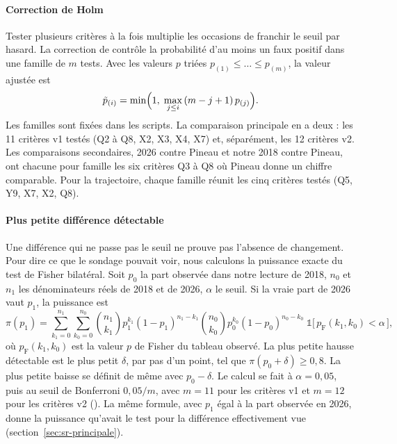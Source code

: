 \paragraph{Correction de Holm}
Tester plusieurs critères à la fois multiplie les occasions de franchir le seuil par hasard. La
correction de \textcite{holm1979simple} contrôle la probabilité d'au moins un faux positif dans une
famille de $m$ tests. Avec les valeurs $p$ triées $p_{(1)} \leq \dots \leq p_{(m)}$, la valeur ajustée
est
\begin{equation}
  \tilde{p}_{(i)} = \min\Bigl(1,\; \max_{j \leq i}\, (m - j + 1)\, p_{(j)} \Bigr).
\end{equation}
Les familles sont fixées dans les scripts. La comparaison principale en a deux : les 11 critères v1
testés (Q2 à Q8, X2, X3, X4, X7) et, séparément, les 12 critères v2. Les comparaisons secondaires,
2026 contre Pineau et notre 2018 contre Pineau, ont chacune pour famille les six critères Q3 à Q8 où
Pineau donne un chiffre comparable. Pour la trajectoire, chaque famille réunit les cinq critères
testés (Q5, Y9, X7, X2, Q8).

\paragraph{Plus petite différence détectable}
Une différence qui ne passe pas le seuil ne prouve pas l'absence de changement. Pour dire ce que le sondage
pouvait voir, nous calculons la puissance exacte du test de Fisher bilatéral. Soit $p_0$ la part observée dans notre lecture de 2018, $n_0$ et $n_1$ les dénominateurs réels
de 2018 et de 2026, $\alpha$ le seuil. Si la vraie part de 2026 vaut $p_1$, la puissance est
\begin{equation}
  \pi(p_1) = \sum_{k_1 = 0}^{n_1} \sum_{k_0 = 0}^{n_0}
  \binom{n_1}{k_1} p_1^{k_1} (1 - p_1)^{n_1 - k_1}
  \binom{n_0}{k_0} p_0^{k_0} (1 - p_0)^{n_0 - k_0}\;
  \mathbb{1}\bigl[\, p_{\text{F}}(k_1, k_0) < \alpha \,\bigr],
\end{equation}
où $p_{\text{F}}(k_1, k_0)$ est la valeur $p$ de Fisher du tableau observé. La plus petite hausse
détectable est le plus petit $\delta$, par pas d'un point, tel que $\pi(p_0 + \delta) \geq 0{,}8$. La
plus petite baisse se définit de même avec $p_0 - \delta$. Le calcul se fait à $\alpha = 0{,}05$, puis
au seuil de Bonferroni $0{,}05/m$, avec $m = 11$ pour les critères v1 et $m = 12$ pour les critères v2
(). La même formule, avec $p_1$ égal à la part observée en 2026, donne la
puissance qu'avait le test pour la différence effectivement vue
(section~\ref{sec:sr-principale}).

